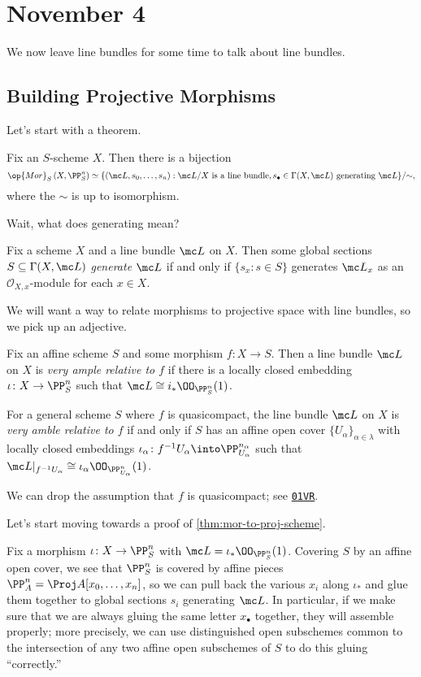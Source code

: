 \documentclass[../notes.tex]{subfiles}
\begin{document}
\section{November 4}

We now leave line bundles for some time to talk about line bundles.

\subsection{Building Projective Morphisms}
Let's start with a theorem.
\begin{theorem} \label{thm:mor-to-proj-scheme}
	Fix an $S$-scheme $X$. Then there is a bijection
	\[\op{Mor}_S\left(X,\PP^n_S\right)\simeq\{(\mc L,s_0,\ldots,s_n):\mc L/X\text{ is a line bundle},s_\bullet\in\Gamma(X,\mc L)\text{ generating }\mc L\}/{\sim},\]
	where the $\sim$ is up to isomorphism.
\end{theorem}
Wait, what does generating mean?
\begin{definition}
	Fix a scheme $X$ and a line bundle $\mc L$ on $X$. Then some global sections $S\subseteq\Gamma(X,\mc L)$ \textit{generate $\mc L$} if and only if $\{s_x:s\in S\}$ generates $\mc L_x$ as an $\mathcal O_{X,x}$-module for each $x\in X$.
\end{definition}
We will want a way to relate morphisms to projective space with line bundles, so we pick up an adjective.
\begin{definition}
	Fix an affine scheme $S$ and some morphism $f\colon X\to S$. Then a line bundle $\mc L$ on $X$ is \textit{very ample relative to $f$} if there is a locally closed embedding $\iota\colon X\to\PP^n_S$ such that $\mc L\cong i_*\OO_{\PP^n_S}(1)$.
	
	For a general scheme $S$ where $f$ is quasicompact, the line bundle $\mc L$ on $X$ is \textit{very amble relative to $f$} if and only if $S$ has an affine open cover $\{U_\alpha\}_{\alpha\in\lambda}$ with locally closed embeddings $\iota_\alpha\colon f^{-1}U_\alpha\into\PP^{n_\alpha}_{U_\alpha}$ such that $\mc L|_{f^{-1}U_\alpha}\cong\iota_\alpha\OO_{\PP^n_{U_\alpha}}(1)$.
\end{definition}
\begin{remark}
	We can drop the assumption that $f$ is quasicompact; see \href{https://stacks.math.columbia.edu/tag/01VR}{\texttt{01VR}}.
\end{remark}
Let's start moving towards a proof of \autoref{thm:mor-to-proj-scheme}.
\begin{ex} \label{ex:get-line-bundle-generators}
	Fix a morphism $\iota\colon X\to\PP^n_S$ with $\mc L=\iota_*\OO_{\PP^n_S}(1)$. Covering $S$ by an affine open cover, we see that $\PP^n_S$ is covered by affine pieces $\PP^n_A=\Proj A[x_0,\ldots,x_n]$, so we can pull back the various $x_i$ along $\iota_*$ and glue them together to global sections $s_i$ generating $\mc L$. In particular, if we make sure that we are always gluing the same letter $x_\bullet$ together, they will assemble properly; more precisely, we can use distinguished open subschemes common to the intersection of any two affine open subschemes of $S$ to do this gluing ``correctly.''
\end{ex}
\end{document}
